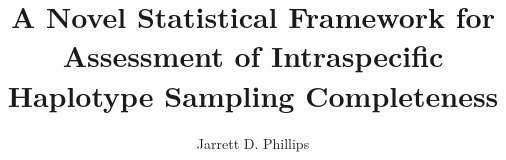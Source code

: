  
\title{A Novel Statistical Framework for Assessment of Intraspecific Haplotype Sampling Completeness}
\author{Jarrett D. Phillips}
%
%
%
\maketitle
